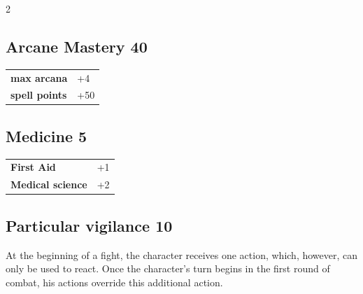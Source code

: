 \begin{multicols}{2}
\begin{tcolorbox}
\vspace{3mm}



\end{tcolorbox}

\begin{tcolorbox}
    \subsection*{Arcane Mastery \hfill \small{40 }}
    \tcblower




\begin{tabular}{@{}ll@{}}
    \textbf{max arcana} & +4\\
    \textbf{spell points} & +50\\
\end{tabular}


\end{tcolorbox}

\begin{tcolorbox}
    \subsection*{Medicine \hfill \small{5 }}
    \tcblower




\begin{tabular}{@{}ll@{}}
    \textbf{First Aid} & +1\\
    \textbf{Medical science} & +2\\
\end{tabular}


\end{tcolorbox}

\begin{tcolorbox}
    \subsection*{Particular vigilance \hfill \small{10 }}
    \tcblower
At the beginning of a fight, the character receives one action, which, however, can only be used to react. Once the character's turn begins in the first round of combat, his actions override this additional action.



\end{tcolorbox}
\end{multicols}

